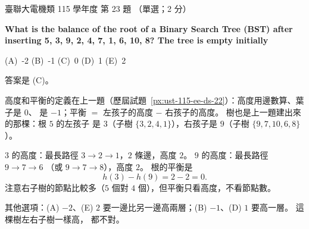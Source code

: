 \begin{pastexam}[label={px:ust-115-ee-ds-23}]{臺聯大電機類 115 學年度 第 23 題}
（單選；2 分）

\textbf{What is the balance of the root of a Binary Search Tree (BST) after inserting 5, 3, 9, 2,
4, 7, 1, 6, 10, 8? The tree is empty initially}

(A)~-2 \qquad (B)~-1 \qquad (C)~0 \qquad (D)~1 \qquad (E)~2
\end{pastexam}

\begin{pastsoln}
答案是 (C)。

高度和平衡的定義在上一題（歷屆試題~\ref{px:ust-115-ee-ds-22}）：高度用邊數算、葉子是 $0$、
\NIL 是 $-1$；平衡 $=$ 左孩子的高度 $-$ 右孩子的高度。 樹也是上一題建出來的那棵：根 $5$ 的左孩子
是 $3$（子樹 $\{3, 2, 4, 1\}$），右孩子是 $9$（子樹 $\{9, 7, 10, 6, 8\}$）。

$3$ 的高度：最長路徑 $3 \to 2 \to 1$，$2$ 條邊，高度 $2$。 $9$ 的高度：最長路徑 $9 \to 7 \to 6$
（或 $9 \to 7 \to 8$），高度 $2$。 根的平衡是
\[
h(3) - h(9) = 2 - 2 = 0 .
\]
注意右子樹的節點比較多（$5$ 個對 $4$ 個），但平衡只看高度，不看節點數。

其他選項：(A) $-2$、(E) $2$ 要一邊比另一邊高兩層；(B) $-1$、(D) $1$ 要高一層。 這棵樹左右子樹一樣高，
都不對。
\end{pastsoln}
